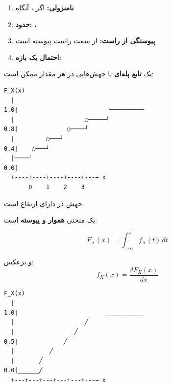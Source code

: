 
\begin{enumerate}
\def\labelenumi{\arabic{enumi}.}
\tightlist
\item
  \textbf{نامنزولی:} اگر ، آنگاه 
\item
  \textbf{حدود:} ، 
\item
  \textbf{پیوستگی از راست:}  از سمت راست پیوسته است
\item
  \textbf{احتمال یک بازه:} 
\end{enumerate}


 یک \textbf{تابع پله‌ای} با جهش‌هایی در هر مقدار ممکن است:


\begin{PSplaincode}
\begin{Verbatim}
F_X(x)
  |
1.0|                          ──────────
  |                    ○─────┘
0.8|              ○────┘
  |         ○───┘
0.4|    ○───┘
  |────┘
0.0|
  +----+----+----+----+---→ x
       0    1    2    3
\end{Verbatim}
\end{PSplaincode}

جهش در  دارای ارتفاع  است.


 یک منحنی \textbf{هموار و پیوسته} است:

\[F_X(x) = \int_{-\infty}^{x} f_X(t) \, dt\]

و برعکس:\PSbr{}\[f_X(x) = \frac{dF_X(x)}{dx}\]


\begin{PSplaincode}
\begin{Verbatim}
F_X(x)
  |
1.0|                         ___________
  |                    ╱
  |                 ╱
0.5|             ╱
  |          ╱
  |       ╱
0.0|______╱
  +---+---+---+---+---+---→ x
\end{Verbatim}
\end{PSplaincode}


